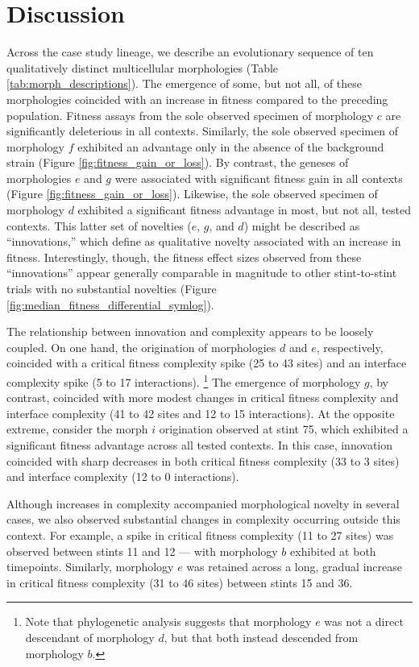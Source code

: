 \section{Discussion}

Across the case study lineage, we describe an evolutionary sequence of ten qualitatively distinct multicellular morphologies (Table \ref{tab:morph_descriptions}).
The emergence of some, but not all, of these morphologies coincided with an increase in fitness compared to the preceding population.
Fitness assays from the sole observed specimen of morphology $c$ are significantly deleterious in all contexts.
Similarly, the sole observed specimen of morphology $f$ exhibited an advantage only in the absence of the background strain (Figure \ref{fig:fitness_gain_or_loss}).
By contrast, the geneses of morphologies $e$ and $g$ were associated with significant fitness gain in all contexts (Figure \ref{fig:fitness_gain_or_loss}).
Likewise, the sole observed specimen of morphology $d$ exhibited a significant fitness advantage in most, but not all, tested contexts.
This latter set of novelties ($e$, $g$, and $d$) might be described as ``innovations,'' which \citet{hochberg2017innovation} define as qualitative novelty associated with an increase in fitness.
Interestingly, though, the fitness effect sizes observed from these ``innovations'' appear generally comparable in magnitude to other stint-to-stint trials with no substantial novelties (Figure \ref{fig:median_fitness_differential_symlog}).

The relationship between innovation and complexity appears to be loosely coupled.
On one hand, the origination of morphologies $d$ and $e$, respectively, coincided with a critical fitness complexity spike (25 to 43 sites) and an interface complexity spike (5 to 17 interactions).%
\footnote{Note that phylogenetic analysis suggests that morphology $e$ was not a direct descendant of morphology $d$, but that both instead descended from morphology $b$.}
The emergence of morphology $g$, by contrast, coincided with more modest changes in critical fitness complexity and interface complexity (41 to 42 sites and 12 to 15 interactions).
At the opposite extreme, consider the morph $i$ origination observed at stint 75, which exhibited a significant fitness advantage across all tested contexts.
In this case, innovation coincided with sharp decreases in both critical fitness complexity (33 to 3 sites) and interface complexity (12 to 0 interactions).

Although increases in complexity accompanied morphological novelty in several cases, we also observed substantial changes in complexity occurring outside this context.
For example, a spike in critical fitness complexity (11 to 27 sites) was observed between stints 11 and 12 --- with morphology $b$ exhibited at both timepoints.
Similarly, morphology $e$ was retained across a long, gradual increase in critical fitness complexity (31 to 46 sites) between stints 15 and 36.

